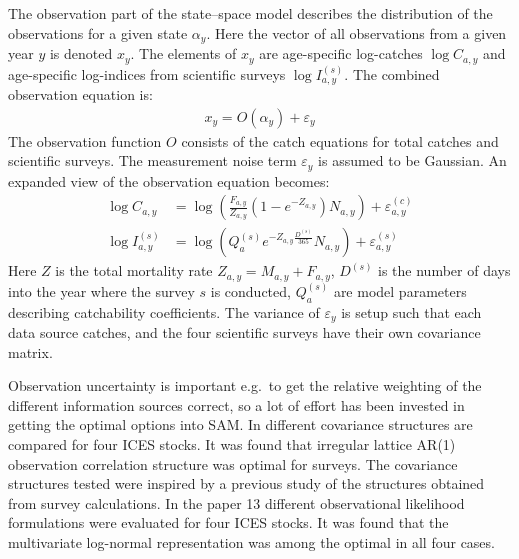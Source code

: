 \documentclass[12pt,letterpaper, leqno]{article}
\begin{document}
The observation part of the state--space model describes the distribution of the observations for a given state $\alpha_y$. Here the vector of all observations from a given year $y$ is denoted $x_y$. The elements of $x_y$ are age-specific log-catches $\log C_{a,y}$ and age-specific log-indices from scientific surveys $\log I^{(s)}_{a,y}$.  The combined observation equation is:
 \begin{align*}
 x_y=O(\alpha_y)+\varepsilon_y
 \end{align*}
 The observation function $O$ consists of the catch equations for total catches and scientific surveys. The measurement noise term $\varepsilon_y$ is assumed to be Gaussian. An expanded view of the observation equation becomes:
 \begin{align*}
 \log C_{a,y} &= 
\log\left(\frac{F_{a,y}}{Z_{a,y}}(1-e^{-Z_{a,y}})N_{a,y}\right)+\varepsilon^{(c)}_{a,y}\\
 \log I^{(s)}_{a,y} &= 
 \log\left(Q^{(s)}_a e^{-Z_{a,y}\frac{D^{(s)}}{365}}N_{a,y}\right)+\varepsilon^{(s)}_{a,y}
\end{align*}   
Here $Z$ is the total mortality rate $Z_{a,y}=M_{a,y}+F_{a,y}$, $D^{(s)}$ is the number of days into the year where the survey $s$ is conducted, $Q^{(s)}_a$ are model parameters describing catchability coefficients. The variance of $\varepsilon_y$ is setup such that each data source catches, and the four scientific surveys have their own covariance matrix. 

Observation uncertainty is important e.g.~to get the relative weighting of the different information sources correct, so a lot of effort has been invested in getting the optimal options into SAM. In \citet{berg2016accounting} different covariance structures are compared for four ICES stocks. It was found that irregular lattice AR(1) observation correlation structure was optimal for surveys. The covariance structures tested were inspired by a previous study \citep{berg2014evaluation} of the structures obtained from survey calculations. In the paper \citet{albertsen2016choosing} 13 different observational likelihood formulations were evaluated for four ICES stocks. It was found that the multivariate log-normal representation was among the optimal in all four cases.
\end{document}
